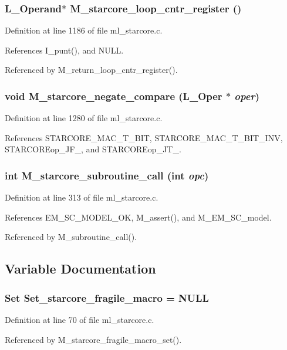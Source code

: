 \subsubsection{\setlength{\rightskip}{0pt plus 5cm}L\_\-Operand$\ast$ M\_\-starcore\_\-loop\_\-cntr\_\-register ()}\label{ml__starcore_8c_cfeadf7a357e658163e0c73dd9637f35}




Definition at line 1186 of file ml\_\-starcore.c.

References I\_\-punt(), and NULL.

Referenced by M\_\-return\_\-loop\_\-cntr\_\-register().
\subsubsection{\setlength{\rightskip}{0pt plus 5cm}void M\_\-starcore\_\-negate\_\-compare (L\_\-Oper $\ast$ {\em oper})}\label{ml__starcore_8c_54c4df5ae7044369fdc37a27f40d89fa}




Definition at line 1280 of file ml\_\-starcore.c.

References STARCORE\_\-MAC\_\-T\_\-BIT, STARCORE\_\-MAC\_\-T\_\-BIT\_\-INV, STARCOREop\_\-JF\_, and STARCOREop\_\-JT\_.
\subsubsection{\setlength{\rightskip}{0pt plus 5cm}int M\_\-starcore\_\-subroutine\_\-call (int {\em opc})}\label{ml__starcore_8c_1e383deabdc6795fc7280a2c82df5222}




Definition at line 313 of file ml\_\-starcore.c.

References EM\_\-SC\_\-MODEL\_\-OK, M\_\-assert(), and M\_\-EM\_\-SC\_\-model.

Referenced by M\_\-subroutine\_\-call().

\subsection{Variable Documentation}
\subsubsection{\setlength{\rightskip}{0pt plus 5cm}\bf{Set} \bf{Set\_\-starcore\_\-fragile\_\-macro} = \bf{NULL}}\label{ml__starcore_8c_35dcf6ca67c1aa9401422c3fe4e6e74f}




Definition at line 70 of file ml\_\-starcore.c.

Referenced by M\_\-starcore\_\-fragile\_\-macro\_\-set().